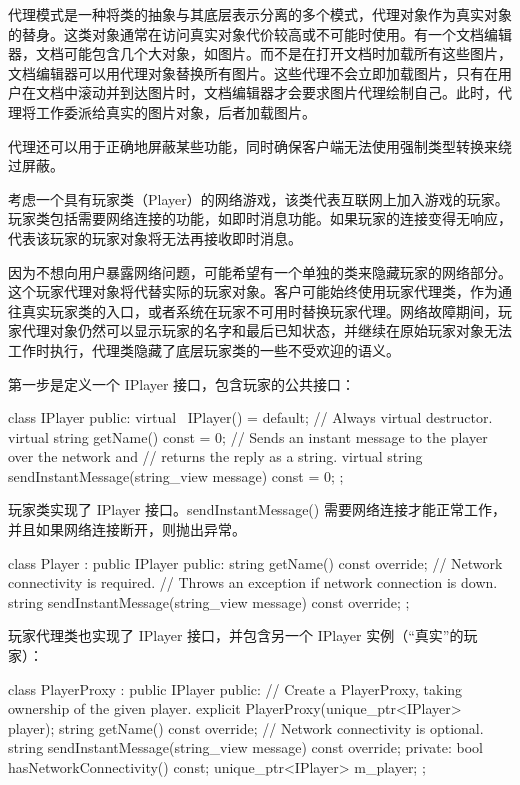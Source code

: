 
代理模式是一种将类的抽象与其底层表示分离的多个模式，代理对象作为真实对象的替身。这类对象通常在访问真实对象代价较高或不可能时使用。有一个文档编辑器，文档可能包含几个大对象，如图片。而不是在打开文档时加载所有这些图片，文档编辑器可以用代理对象替换所有图片。这些代理不会立即加载图片，只有在用户在文档中滚动并到达图片时，文档编辑器才会要求图片代理绘制自己。此时，代理将工作委派给真实的图片对象，后者加载图片。

代理还可以用于正确地屏蔽某些功能，同时确保客户端无法使用强制类型转换来绕过屏蔽。


考虑一个具有玩家类（Player）的网络游戏，该类代表互联网上加入游戏的玩家。玩家类包括需要网络连接的功能，如即时消息功能。如果玩家的连接变得无响应，代表该玩家的玩家对象将无法再接收即时消息。

因为不想向用户暴露网络问题，可能希望有一个单独的类来隐藏玩家的网络部分。这个玩家代理对象将代替实际的玩家对象。客户可能始终使用玩家代理类，作为通往真实玩家类的入口，或者系统在玩家不可用时替换玩家代理。网络故障期间，玩家代理对象仍然可以显示玩家的名字和最后已知状态，并继续在原始玩家对象无法工作时执行，代理类隐藏了底层玩家类的一些不受欢迎的语义。


第一步是定义一个 IPlayer 接口，包含玩家的公共接口：

\begin{cpp}
class IPlayer
{
    public:
        virtual ~IPlayer() = default; // Always virtual destructor.
        virtual string getName() const = 0;
        // Sends an instant message to the player over the network and
        // returns the reply as a string.
        virtual string sendInstantMessage(string_view message) const = 0;
};
\end{cpp}

玩家类实现了 IPlayer 接口。sendInstantMessage() 需要网络连接才能正常工作，并且如果网络连接断开，则抛出异常。

\begin{cpp}
class Player : public IPlayer
{
    public:
        string getName() const override;
        // Network connectivity is required.
        // Throws an exception if network connection is down.
        string sendInstantMessage(string_view message) const override;
};
\end{cpp}

玩家代理类也实现了 IPlayer 接口，并包含另一个 IPlayer 实例（“真实”的玩家）：

\begin{cpp}
class PlayerProxy : public IPlayer
{
    public:
        // Create a PlayerProxy, taking ownership of the given player.
        explicit PlayerProxy(unique_ptr<IPlayer> player);
        string getName() const override;
        // Network connectivity is optional.
        string sendInstantMessage(string_view message) const override;
    private:
        bool hasNetworkConnectivity() const;
        unique_ptr<IPlayer> m_player;
};
\end{cpp}

